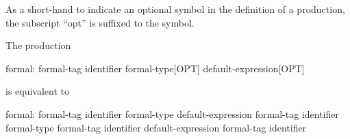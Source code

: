 As a short-hand to indicate an optional symbol in the definition of a
production, the subscript ``opt'' is suffixed to the symbol.
\begin{example}
The production
\begin{syntax_donotcollect}
formal:
  formal-tag identifier formal-type[OPT] default-expression[OPT]
\end{syntax_donotcollect}
is equivalent to
\begin{syntax_donotcollect}
formal:
  formal-tag identifier formal-type default-expression
  formal-tag identifier formal-type
  formal-tag identifier default-expression
  formal-tag identifier
\end{syntax_donotcollect}
\end{example}
